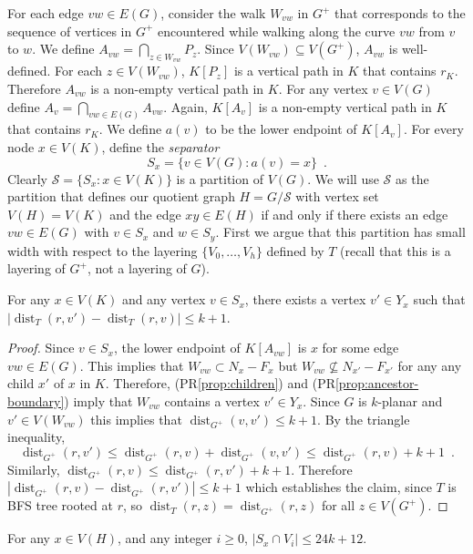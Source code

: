 \documentclass{patmorin}
\DeclareMathOperator{\dist}{dist}
\renewcommand{\propref}[1]{(PR\ref{prop:#1})}
\begin{document}
For each edge $vw\in E(G)$, consider the walk $W_{vw}$ in $G^+$ that corresponds to the sequence of vertices in $G^+$ encountered while walking along the curve $vw$ from $v$ to $w$. We define $A_{vw}=\bigcap_{z\in W_{vw}} P_z$.  Since $V(W_{vw})\subseteq V(G^+)$, $A_{vw}$ is well-defined.  For each $z\in V(W_{vw})$, $K[P_{z}]$ is a vertical path in $K$ that contains $r_K$.   Therefore $A_{vw}$ is a non-empty vertical path in $K$.  For any vertex $v\in V(G)$ define $A_v=\bigcap_{vw\in E(G)} A_{vw}$.  Again, $K[A_v]$ is a non-empty vertical path in $K$ that contains $r_K$.  We define $a(v)$ to be the lower endpoint of $K[A_v]$.  For every node $x\in V(K)$, define the \emph{separator}
\[
   S_x = \{v\in V(G): a(v)=x \} \enspace .
\]
Clearly $\mathcal{S}=\{S_x:x\in V(K)\}$ is a partition of $V(G)$.  We will use $\mathcal{S}$ as the partition that defines our quotient graph $H=G/\mathcal{S}$ with vertex set $V(H)=V(K)$ and the edge $xy\in E(H)$ if and only if there exists an edge $vw\in E(G)$ with $v\in S_x$ and $w\in S_y$.  First we argue that this partition has small width with respect to the layering $\{V_0,\ldots,V_h\}$ defined by $T$ (recall that this is a layering of $G^+$, not a layering of $G$).

\begin{clm}
   For any $x\in V(K)$ and any vertex $v\in S_x$, there exists a vertex $v'\in Y_x$ such that $|\dist_T(r,v')-\dist_T(r,v)|\le k+1$.  
\end{clm}

\begin{proof}
  Since $v\in S_x$, the lower endpoint of $K[A_{vw}]$ is $x$ for some edge $vw\in E(G)$.  This implies that $W_{vw}\subset N_x-F_x$ but $W_{vw} \not\subseteq N_{x'}-F_{x'}$ for any any child $x'$ of $x$ in $K$. Therefore, \propref{children} and \propref{ancestor-boundary} imply that $W_{vw}$ contains a vertex $v'\in Y_x$.  Since $G$ is $k$-planar and $v'\in V(W_{vw})$ this implies that $\dist_{G^+}(v,v') \le k+1$.
  By the triangle inequality,     
  \[
    \dist_{G^+}(r,v') \le \dist_{G^+}(r,v) + \dist_{G^+}(v,v') \le \dist_{G^+}(r,v) + k + 1 \enspace .
  \]
  Similarly, $\dist_{G^+}(r,v) \le \dist_{G^+}(r, v') + k+1$.  Therefore
  $|\dist_{G^+}(r,v)-\dist_{G^+}(r,v')| \le k+1$ which establishes the claim, since $T$ is BFS tree rooted at $r$, so $\dist_{T}(r,z)=\dist_{G^+}(r,z)$ for all $z\in V(G^+)$.
\end{proof}

\begin{clm}
  For any $x\in V(H)$, and any integer $i\ge 0$, $|S_x\cap V_i|\le 24k+12$.
\end{clm}
\end{document}
